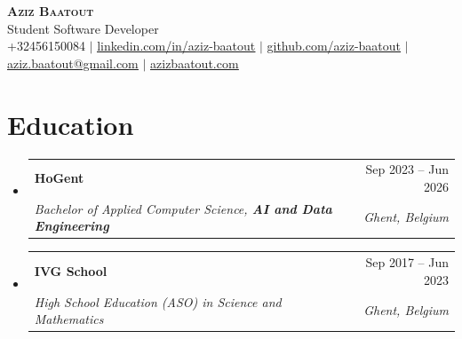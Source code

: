 \documentclass[letterpaper,11pt]{article}
\makeatletter
\newcommand{\resumeSubheading}[4]{
  \vspace{-2pt}\item
    \begin{tabular*}{0.97\textwidth}[t]{l@{\extracolsep{\fill}}r}
      \textbf{#1} & #2 \\
      \textit{\small#3} & \textit{\small #4} \\
    \end{tabular*}\vspace{-7pt}
}
\newcommand{\resumeSubHeadingListStart}{\begin{itemize}[leftmargin=0.15in, label={}]}
\newcommand{\resumeSubHeadingListEnd}{\end{itemize}}
\makeatother
\begin{document}
\begin{center}
    \textbf{\Huge \scshape Aziz Baatout} \\ \vspace{1pt}
    \small Student Software Developer \\ \vspace{2pt}
    \small +32456150084 $|$ 
    \href{https://linkedin.com/in/aziz-baatout}{\underline{linkedin.com/in/aziz-baatout}} $|$ \href{https://github.com/aziz-baatout}{\underline{github.com/aziz-baatout}} $|$ \href{mailto:aziz.baatout@gmail.com}{\underline{aziz.baatout@gmail.com}} $|$ \href{https://azizbaatout.com}{\underline{azizbaatout.com}}
\end{center}

\section{Education}
  \resumeSubHeadingListStart
  \resumeSubheading
      {HoGent}{Sep 2023 -- Jun 2026}
      {Bachelor of Applied Computer Science, \textbf{AI and Data Engineering}}{Ghent, Belgium}
\vspace{5pt}
\resumeSubheading
      {IVG School}{Sep 2017 -- Jun 2023}
      {High School Education (ASO) in Science and Mathematics}{Ghent, Belgium}
  \resumeSubHeadingListEnd
\end{document}
